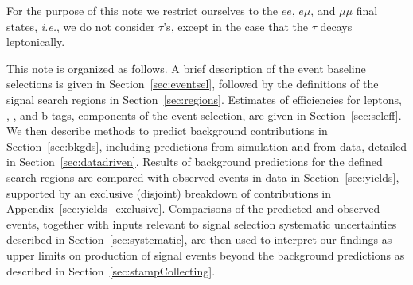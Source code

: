 For the purpose of this note we restrict ourselves to the $ee$, $e\mu$, and $\mu\mu$ 
final states, {\em i.e.}, we do not consider $\tau$'s, except in the case that the $\tau$ decays leptonically.

This note is organized as follows.
A brief description of the event baseline selections is given in Section~\ref{sec:eventsel},
followed by the definitions of the signal search regions in Section~\ref{sec:regions}.
Estimates of efficiencies for leptons, \met, \Ht, and b-tags, components of the event selection,
are given in Section~\ref{sec:seleff}.
We then describe methods to predict background contributions in Section~\ref{sec:bkgds},
including predictions from simulation and from data, detailed in Section~\ref{sec:datadriven}.
Results of background predictions for the defined search regions are compared with 
observed events in data in Section~\ref{sec:yields},
supported by an exclusive (disjoint) breakdown of contributions in Appendix~\ref{sec:yields_exclusive}.
Comparisons of the predicted and observed events, together with inputs relevant
to signal selection systematic uncertainties described in Section~\ref{sec:systematic}, are then used
to interpret our findings as upper limits on production of signal events beyond
the background predictions as described in Section~\ref{sec:stampCollecting}.






